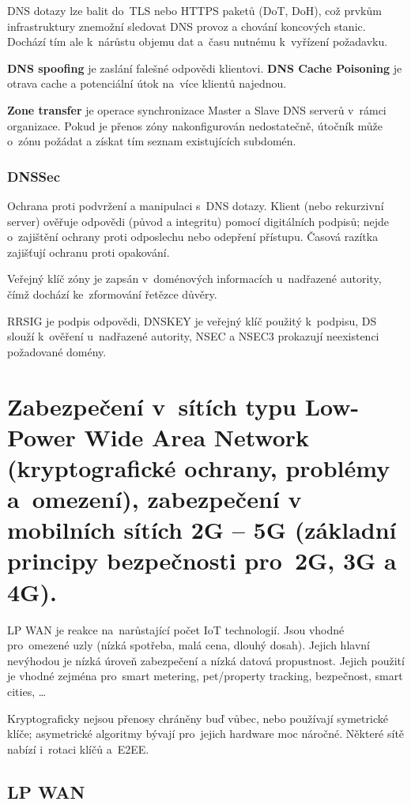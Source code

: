 DNS dotazy lze balit do~TLS nebo HTTPS paketů  (DoT, DoH), což prvkům infrastruktury znemožní sledovat DNS provoz a chování koncových stanic.
Dochází tím ale k~nárůstu objemu dat a~času nutnému k~vyřízení požadavku.

\textbf{DNS spoofing} je zaslání falešné odpovědi klientovi.
\textbf{DNS Cache Poisoning} je otrava cache a potenciální útok na~více klientů najednou.

\textbf{Zone transfer} je operace synchronizace Master a Slave DNS serverů v~rámci organizace.
Pokud je přenos zóny nakonfigurován nedostatečně, útočník může o~zónu požádat a získat tím seznam existujících subdomén.


\subsubsection{DNSSec}

Ochrana proti podvržení a manipulaci s~DNS dotazy.
Klient (nebo rekurzivní server) ověřuje odpovědi (původ a integritu) pomocí digitálních podpisů; nejde o~zajištění ochrany proti odposlechu nebo odepření přístupu.
Časová razítka zajišťují ochranu proti opakování.

Veřejný klíč zóny je zapsán v~doménových informacích u~nadřazené autority, čímž dochází ke~zformování řetězce důvěry.

RRSIG je podpis odpovědi, DNSKEY je veřejný klíč použitý k~podpisu, DS slouží k~ověření u~nadřazené autority, NSEC a NSEC3 prokazují neexistenci požadované domény.


\clearpage
\section{Zabezpečení v~sítích typu Low-Power Wide Area Network (kryptografické ochrany, problémy a~omezení), zabezpečení v mobilních sítích 2G -- 5G (základní principy bezpečnosti pro~2G, 3G a 4G).}

LP WAN je reakce na~narůstající počet IoT technologií.
Jsou vhodné pro~omezené uzly (nízká spotřeba, malá cena, dlouhý dosah).
Jejich hlavní nevýhodou je nízká úroveň zabezpečení a nízká datová propustnost.
Jejich použití je vhodné zejména pro~smart metering, pet/property tracking, bezpečnost, smart cities, \dots

Kryptograficky nejsou přenosy chráněny buď vůbec, nebo používají symetrické klíče; asymetrické algoritmy bývají pro~jejich hardware moc náročné.
Některé sítě nabízí i~rotaci klíčů a~E2EE.


\subsection{LP WAN}

